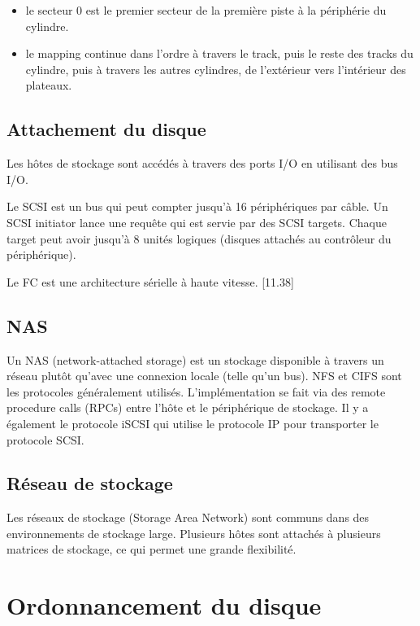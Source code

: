 	\begin{itemize}
		\item le secteur 0 est le premier secteur de la première piste à la périphérie du cylindre.
		\item le mapping continue dans l'ordre à travers le track, puis le reste des tracks du cylindre, puis à travers les autres cylindres, de l'extérieur vers l'intérieur des plateaux.
	\end{itemize}
	
	\subsection{Attachement du disque}
	
	Les hôtes de stockage sont accédés à travers des ports I/O en utilisant des bus I/O.
	
	Le SCSI est un bus qui peut compter jusqu'à 16 périphériques par câble. Un SCSI initiator lance une requête qui est servie par des SCSI targets. Chaque target peut avoir jusqu'à 8 unités logiques (disques attachés au contrôleur du périphérique).
	
	Le FC est une architecture sérielle à haute vitesse. [11.38]
	
	\subsection{NAS}
	
	Un NAS (network-attached storage) est un stockage disponible à travers un réseau plutôt qu'avec une connexion locale (telle qu'un bus). NFS et CIFS sont les protocoles généralement utilisés. L'implémentation se fait via des remote procedure calls (RPCs) entre l'hôte et le périphérique de stockage. Il y a également le protocole iSCSI qui utilise le protocole IP pour transporter le protocole SCSI.
	
	
	\subsection{Réseau de stockage}
	
	Les réseaux de stockage (Storage Area Network) sont communs dans des environnements de stockage large. Plusieurs hôtes sont attachés à plusieurs matrices de stockage, ce qui permet une grande flexibilité.
	
	
\section{Ordonnancement du disque}
	
